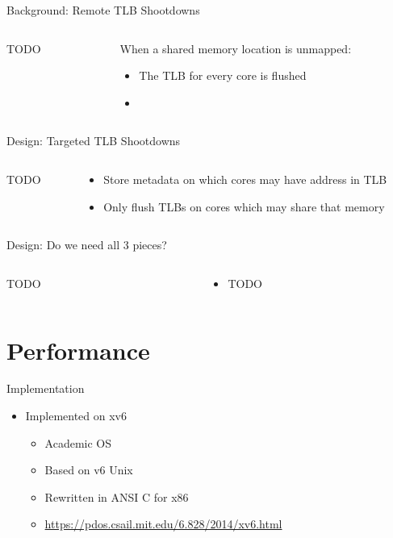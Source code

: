 \documentclass[aspectratio=169]{beamer}
\newcommand{\bi}{\begin{itemize}}
\newcommand{\ei}{\end{itemize}}
\begin{document}
\begin{frame}{Background: Remote TLB Shootdowns}
  \begin{columns}[T]
    \begin{column}{0.2\textwidth}
      TODO
    \end{column}
    \begin{column}{0.8\textwidth}
      When a shared memory location is unmapped:
      \bi
    \item The TLB for every core is flushed
    \item \color{red}{This is expensive!}
      \ei
    \end{column}
  \end{columns}
\end{frame}

\begin{frame}{Design: Targeted TLB Shootdowns}
  \begin{columns}[T]
    \begin{column}{0.2\textwidth}
      TODO
    \end{column}
    \begin{column}{0.8\textwidth}
      \bi
    \item Store metadata on which cores may have address in TLB
    \item Only flush TLBs on cores which may share that memory
      \ei
    \end{column}
  \end{columns}
\end{frame}

\begin{frame}{Design: Do we need all 3 pieces?}
  \begin{columns}[T]
    \begin{column}{0.2\textwidth}
      TODO
    \end{column}
    \begin{column}{0.8\textwidth}
      \bi
    \item TODO
      \ei
    \end{column}
  \end{columns}
\end{frame}

\section{Performance}

\begin{frame}{Implementation}
  \begin{center}
    \bi
  \item Implemented on xv6
    \bi
  \item Academic OS
  \item Based on v6 Unix
  \item Rewritten in ANSI C for x86
  \item \url{https://pdos.csail.mit.edu/6.828/2014/xv6.html}
    \ei
    \ei
  \end{center}
\end{frame}
\end{document}

